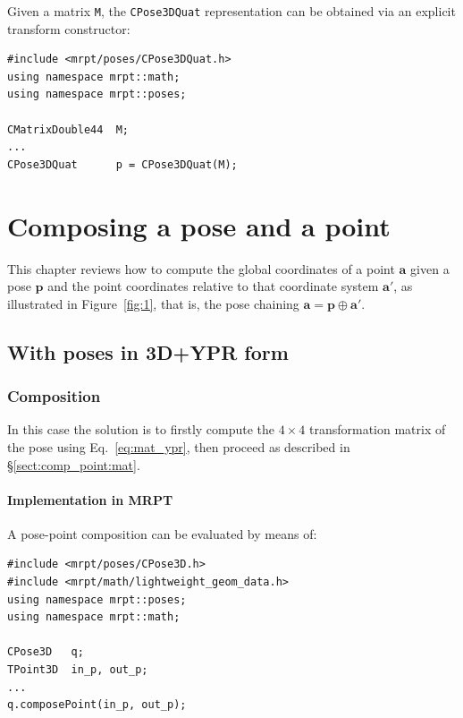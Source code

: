 \documentclass[a4paper,11pt]{report}
\begin{document}
Given a matrix \texttt{M}, the \texttt{CPose3DQuat} representation can be obtained via
an explicit transform constructor:

\begin{lstlisting}
#include <mrpt/poses/CPose3DQuat.h>
using namespace mrpt::math;
using namespace mrpt::poses;

CMatrixDouble44  M;
...
CPose3DQuat      p = CPose3DQuat(M);
\end{lstlisting}





\chapter{Composing a pose and a point}
\label{ch:comp_pose_pt}

This chapter reviews how to compute the global coordinates of a point $\mathbf{a}$
given a pose $\mathbf{p}$ and the point coordinates relative to that coordinate system $\mathbf{a'}$,
as illustrated in Figure~\ref{fig:1}, that is, the pose chaining $\mathbf{a} = \mathbf{p} \oplus \mathbf{a'}$.

\section{With poses in 3D+YPR form}

\subsection{Composition}

In this case the solution is to firstly compute the $4 \times 4$
transformation matrix of the pose using Eq.~\ref{eq:mat_ypr}, then proceed
as described in \S \ref{sect:comp_point:mat}.


\subsubsection{Implementation in MRPT}

A pose-point composition can be evaluated by means of:

\begin{lstlisting}
#include <mrpt/poses/CPose3D.h>
#include <mrpt/math/lightweight_geom_data.h>
using namespace mrpt::poses;
using namespace mrpt::math;

CPose3D   q;
TPoint3D  in_p, out_p;
...
q.composePoint(in_p, out_p);
\end{lstlisting}
\end{document}
